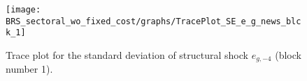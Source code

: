 \begin{figure}[H]
\centering
  \texttt{[image: BRS\_sectoral\_wo\_fixed\_cost/graphs/TracePlot\_SE\_e\_g\_news\_blck\_1]}\\
    \caption{Trace plot for the standard deviation of structural shock ${e_{g,-4}}$ (block number 1).}
\end{figure}
